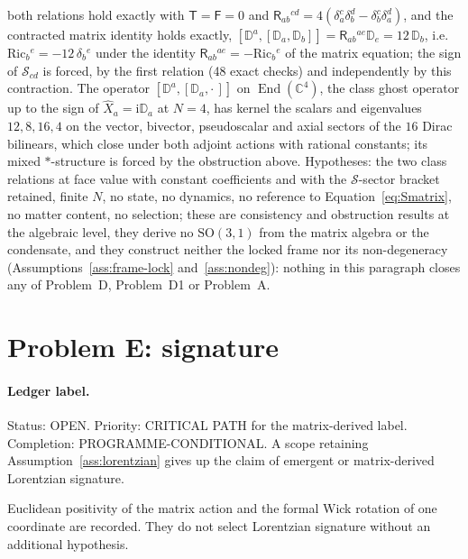 both relations hold exactly with \(\mathsf T=\mathsf F=0\) and \(\mathsf R_{ab}{}^{cd}=4(\delta_a^c\delta_b^d-\delta_b^c\delta_a^d)\), and the contracted matrix identity holds exactly, \([\mathbb D^a,[\mathbb D_a,\mathbb D_b]]=\mathsf R_{ab}{}^{ae}\mathbb D_e=12\,\mathbb D_b\), i.e. \(\mathrm{Ric}_b{}^e=-12\,\delta_b{}^e\) under the identity \(\mathsf R_{ab}{}^{ae}=-\mathrm{Ric}_b{}^e\) of the matrix equation; the sign of \(\mathcal S_{cd}\) is forced, by the first relation (48 exact checks) and independently by this contraction. The operator \([\mathbb D^a,[\mathbb D_a,\cdot\,]]\) on \(\operatorname{End}(\mathbb C^4)\), the class ghost operator up to the sign of \(\hat X_a=\mathrm i\mathbb D_a\) at \(N=4\), has kernel the scalars and eigenvalues \(12,8,16,4\) on the vector, bivector, pseudoscalar and axial sectors of the \(16\) Dirac bilinears, which close under both adjoint actions with rational constants; its mixed \(*\)-structure is forced by the obstruction above. Hypotheses: the two class relations at face value with constant coefficients and with the \(\mathcal S\)-sector bracket retained, finite \(N\), no state, no dynamics, no reference to Equation~\eqref{eq:Smatrix}, no matter content, no selection; these are consistency and obstruction results at the algebraic level, they derive no \(\mathrm{SO}(3,1)\) from the matrix algebra or the condensate, and they construct neither the locked frame nor its non-degeneracy (Assumptions~\ref{ass:frame-lock} and~\ref{ass:nondeg}): nothing in this paragraph closes any of Problem~D, Problem~D1 or Problem~A.

\section{Problem E: signature}
\label{sec:status-E}

\paragraph{Ledger label.}
Status: OPEN. Priority: CRITICAL PATH for the matrix-derived label.
Completion: PROGRAMME-CONDITIONAL. A scope retaining
Assumption~\ref{ass:lorentzian} gives up the claim of emergent or
matrix-derived Lorentzian signature.

Euclidean positivity of the matrix action and the formal Wick rotation of
one coordinate are recorded. They do not select Lorentzian signature without
an additional hypothesis.

